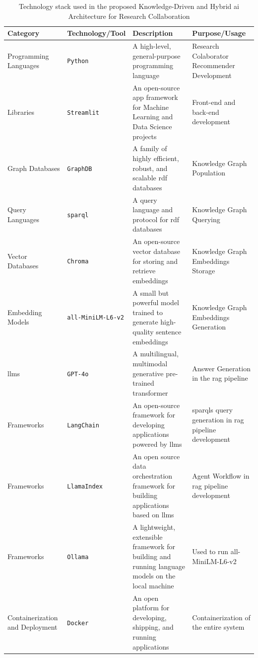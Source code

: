 \begin{table}[htbp]
    \centering
    \scriptsize
    \begin{tabularx}{\textwidth}{|>{\centering\arraybackslash}p{2cm}|>{\centering\arraybackslash}p{2.5cm}|X|X|}
      \hline
      \textbf{Category} & \textbf{Technology/Tool} & \textbf{Description} & \textbf{Purpose/Usage} \\
        \hline
        Programming Languages & \texttt{Python} & A high-level, general-purpose programming language & Research Colaborator Recommender Development\\
        \hline
        Libraries & \texttt{Streamlit} & An open-source app framework for Machine Learning and Data Science projects & Front-end and back-end development\\
        \hline
        Graph Databases & \texttt{GraphDB} & A family of highly efficient, robust, and scalable \gls{rdf} databases & Knowledge Graph Population\\
        \hline
        Query Languages & \texttt{\gls{sparql}} & A query language and protocol for \gls{rdf} databases & Knowledge Graph Querying\\
        \hline
        Vector Databases & \texttt{Chroma} & An open-source vector database for storing and retrieve embeddings & Knowledge Graph Embeddings Storage\\
        \hline
        Embedding Models & \texttt{all-MiniLM-L6-v2} & A small but powerful model trained to generate high-quality sentence embeddings & Knowledge Graph Embeddings Generation\\
        \hline
        \glspl{llm} & \texttt{GPT-4o} & A multilingual, multimodal generative pre-trained transformer & Answer Generation in the \gls{rag} pipeline\\
        \hline
        Frameworks & \texttt{LangChain} & An open-source framework for developing applications powered by \glspl{llm} & \glspl{sparql} query generation in \gls{rag} pipeline development\\
        \hline
        Frameworks & \texttt{LlamaIndex} & An open source data orchestration framework for building applications based on \glspl{llm} & Agent Workflow in \gls{rag} pipeline development\\
        \hline
        Frameworks & \texttt{Ollama} & A lightweight, extensible framework for building and running language models on the local machine & Used to run all-MiniLM-L6-v2\\
        \hline
        Containerization and Deployment & \texttt{Docker} & An open platform for developing, shipping, and running applications & Containerization of the entire system\\
        \hline
    \end{tabularx}
    \caption{Technology stack used in the proposed Knowledge-Driven and Hybrid \gls{ai} Architecture for Research Collaboration}
    \label{tab:technology-stack}
\end{table}

